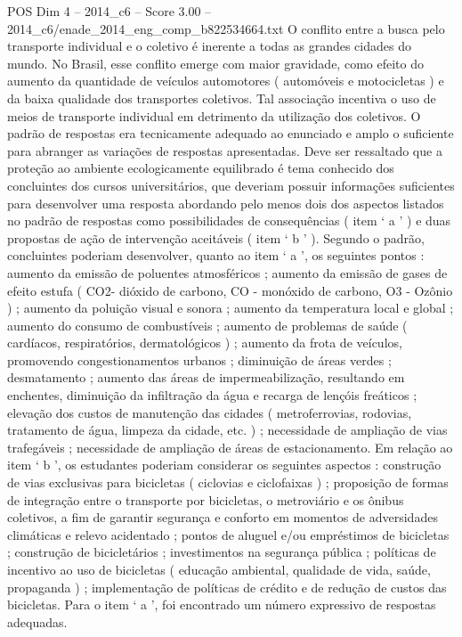\begin{textsample}{POS Dim 4 – 2014\_c6 – Score 3.00 – 2014\_c6/enade\_2014\_eng\_comp\_b822534664.txt}
O conflito entre a busca pelo transporte individual e o coletivo é inerente a todas as grandes cidades do mundo.
No Brasil, esse conflito emerge com maior gravidade, como efeito do aumento da quantidade de veículos automotores ( automóveis e motocicletas ) e da baixa qualidade dos transportes coletivos.
Tal associação incentiva o uso de meios de transporte individual em detrimento da utilização dos coletivos.
O padrão de respostas era tecnicamente adequado ao enunciado e amplo o suficiente para abranger as variações de respostas apresentadas.
Deve ser ressaltado que a proteção ao ambiente ecologicamente equilibrado é tema conhecido dos concluintes dos cursos universitários, que deveriam possuir informações suficientes para desenvolver uma resposta abordando pelo menos dois dos aspectos listados no padrão de respostas como possibilidades de consequências ( item ‘ a ’ ) e duas propostas de ação de intervenção aceitáveis ( item ‘ b ’ ).
Segundo o padrão, concluintes poderiam desenvolver, quanto ao item ‘ a ’, os seguintes pontos : aumento da emissão de poluentes atmosféricos ; aumento da emissão de gases de efeito estufa ( CO2- dióxido de carbono, CO - monóxido de carbono, O3 - Ozônio ) ; aumento da poluição visual e sonora ; aumento da temperatura local e global ; aumento do consumo de combustíveis ; aumento de problemas de saúde ( cardíacos, respiratórios, dermatológicos ) ; aumento da frota de veículos, promovendo congestionamentos urbanos ; diminuição de áreas verdes ; desmatamento ; aumento das áreas de impermeabilização, resultando em enchentes, diminuição da infiltração da água e recarga de lençóis freáticos ; elevação dos custos de manutenção das cidades ( metroferrovias, rodovias, tratamento de água, limpeza da cidade, etc. ) ; necessidade de ampliação de vias trafegáveis ; necessidade de ampliação de áreas de estacionamento.
Em relação ao item ‘ b ’, os estudantes poderiam considerar os seguintes aspectos : construção de vias exclusivas para bicicletas ( ciclovias e ciclofaixas ) ; proposição de formas de integração entre o transporte por bicicletas, o metroviário e os ônibus coletivos, a fim de garantir segurança e conforto em momentos de adversidades climáticas e relevo acidentado ; pontos de aluguel e/ou empréstimos de bicicletas ; construção de bicicletários ; investimentos na segurança pública ; políticas de incentivo ao uso de bicicletas ( educação ambiental, qualidade de vida, saúde, propaganda ) ; implementação de políticas de crédito e de redução de custos das bicicletas.
Para o item ‘ a ’, foi encontrado um número expressivo de respostas adequadas.

\end{textsample}

